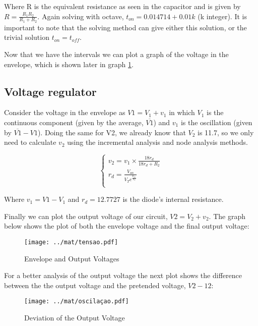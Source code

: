 Where R is the equivalent resistance as seen in the capacitor and is given by $R=\frac{R_1 R_2}{R_1 + R_2}$. Again solving with octave, $t_{on}=0.014714 + 0.01k$ (k integer). It is important to note that the solving method can give either this solution, or the trivial solution $t_{on}=t_{off}$.
\par
Now that we have the intervals we can plot a graph of the voltage in the envelope, which is shown later in graph \ref{fig:tensaoF}.

\subsection{Voltage regulator}
Consider the voltage in the envelope as $V1=V_1 + v_1$ in which $V_1$ is the continuous component (given by the average, $\overline{V1}$) and $v_1$ is the oscillation (given by $\overline{V1} - V1$).
Doing the same for V2, we already know that $V_2$ is 11.7, so we only need to calculate $v_2$ using the incremental analysis and node analysis methods.

\begin{equation}\label{eq:v_2}

\begin{cases}
v_2=v_1\times \frac{18 r_d}{18 r_d + R_2} \\
r_d=\frac{V_{on}}{V_T e^{\frac{V_{on}}{V_T}}}\\
\end{cases}
\end{equation}

Where $v_1= V1 - V_1$ and $r_d=12.7727$ is the diode's internal resistance.
\par
Finally we can plot the output voltage of our circuit, $V2=V_2 + v_2$. The graph below shows the plot of both the envelope voltage and the final output voltage:

\begin{figure}[H] \centering
\texttt{[image: ../mat/tensao.pdf]}
\caption{Envelope and Output Voltages}
\label{fig:tensaoF}
\end{figure}

For a better analysis of the output voltage the next plot shows the difference between the the output voltage and the pretended voltage, $V2-12$:

\begin{figure}[H] \centering
\texttt{[image: ../mat/oscilaçao.pdf]}
\caption{Deviation of the Output Voltage}
\label{fig:desvio}
\end{figure}



